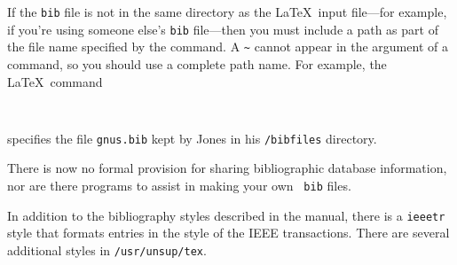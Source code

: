 If the {\tt bib} file is not in the same directory as the \LaTeX\ input
file---for example, if you're using someone else's {\tt bib}
file---then you must include a path as part of the file name specified
by the \hbox{\verb||} command.  A \verb|~| cannot appear
in the argument of a \hbox{\verb||} command, so you should
use a complete path name.  For example, the \LaTeX\ command
\begin{verbatim}
     
\end{verbatim}
specifies the file \mbox{\tt gnus.bib} kept by Jones in his 
\mbox{\tt /bibfiles} directory.


There is now no formal provision for sharing bibliographic database
information, nor are there programs to assist in making your own {\tt
bib} files.

In addition to the bibliography styles described in the manual, there
is a {\tt ieeetr} style that formats entries in the style of the IEEE
transactions.
There are several additional styles in {\tt /usr/unsup/tex}.

